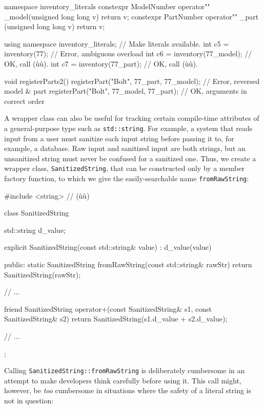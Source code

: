 \begin{emcppslisting}[emcppsbatch=e14]
namespace inventory_literals
{
    constexpr ModelNumber operator"" _model(unsigned long long v) { return v; }
    constexpr PartNumber  operator"" _part (unsigned long long v) { return v; }
}

using namespace inventory_literals;  // Make literals available.
int c5 = inventory(77);              // Error, ambiguous overload
int c6 = inventory(77_model);        // OK, call (ù{}ù).
int c7 = inventory(77_part);         // OK, call (ù{}ù).

void registerParts2()
{
    registerPart("Bolt", 77_part, 77_model); // Error, reversed model & part
    registerPart("Bolt", 77_model, 77_part); // OK, arguments in correct order
}
\end{emcppslisting}

\noindent A wrapper class can also be useful for tracking certain compile-time
attributes of a general-purpose type such as \lstinline!std::string!. For
example, a system that reads input from a user must sanitize each input
string before passing it to, for example, a database. Raw input and
sanitized input are both strings, but an unsanitized string must never
be confused for a sanitized one. Thus, we create a wrapper class,
\lstinline!SanitizedString!, that can be constructed only by a member
factory function, to which we give the easily-searchable name
\lstinline!fromRawString!:

\begin{emcppslisting}[emcppsbatch=e15]
#include <string>  // (ù{}ù)

class SanitizedString
{
    std::string d_value;

    explicit SanitizedString(const std::string& value) : d_value(value) { }

public:
    static SanitizedString fromRawString(const std::string& rawStr)
    {
        return SanitizedString(rawStr);
    }

    // ...

    friend SanitizedString operator+(const SanitizedString& s1,
                                     const SanitizedString& s2)
    {
        return SanitizedString(s1.d_value + s2.d_value);
    }

    // ...
};
\end{emcppslisting}

\noindent Calling \lstinline!SanitizedString::fromRawString! is deliberately
cumbersome in an attempt to make developers think carefully before using
it. This call might, however, be \emph{too} cumbersome in situations where the safety
of a literal string is not in question:

